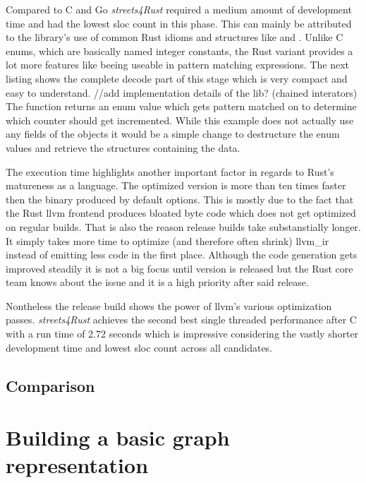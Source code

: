 Compared to C and Go \textit{streets4Rust} required a medium amount of development time and had the lowest \gls{sloc} count in this phase. This can mainly be attributed to the library's use of common Rust idioms and structures like  and . Unlike C enums, which are basically named integer constants, the Rust variant provides a lot more features like beeing useable in pattern matching expressions. The next listing shows the complete decode part of this stage which is very compact and easy to understand.  //add implementation details of the lib? (chained interators)
\\


The function  returns an enum value which gets pattern matched on to determine which counter should get incremented. While this example does not actually use any fields of the objects it would be a simple change to destructure the enum values and retrieve the structures containing the data.

The execution time highlights another important factor in regards to Rust's matureness as a language. The optimized version is more than ten times faster then the binary produced by default options. This is mostly due to the fact that the Rust \gls{llvm} frontend produces bloated byte code which does not get optimized on regular builds. That is also the reason release builds take substanstially longer. It simply takes more time to optimize (and therefore often shrink) \gls{llvm_ir} instead of emitting less code in the first place. Although the code generation gets improved steadily it is not a big focus until version  is released but the Rust core team knows about the issue and it is a high priority after said release.

Nontheless the release build shows the power of \gls{llvm}'s various optimization passes. \textit{streets4Rust} achieves the second best single threaded performance after C with a run time of 2.72 seconds which is impressive considering the vastly shorter development time and lowest \gls{sloc} count across all candidates.

\subsection{Comparison}
\label{subsec:Implementation::Counting::Comparison}

\section{Building a basic graph representation}
\label{sec:Implementation::Graph_Representation}


